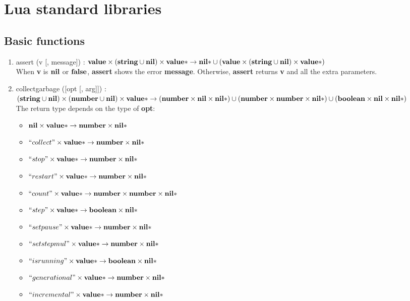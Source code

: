 
\section{Lua standard libraries}

\subsection{Basic functions}

\begin{enumerate}
\item assert (v [, message]) :
$\mathbf{value} \times
(\mathbf{string} \cup \mathbf{nil}) \times
\mathbf{value}{*} \rightarrow
\mathbf{nil}{*} \cup
(\mathbf{value} \times
(\mathbf{string} \cup \mathbf{nil}) \times
\mathbf{value}{*})$ 
\\
When \textbf{v} is $\mathbf{nil}$ or $\mathbf{false}$, \textbf{assert}
shows the error \textbf{message}.
Otherwise, \textbf{assert} returns \textbf{v} and all the extra
parameters.
\item collectgarbage ([opt [, arg]]) :
$(\mathbf{string} \cup \mathbf{nil}) \times
(\mathbf{number} \cup \mathbf{nil}) \times
\mathbf{value}{*} \rightarrow
(\mathbf{number} \times \mathbf{nil} \times \mathbf{nil}{*}) \cup
(\mathbf{number} \times \mathbf{number} \times \mathbf{nil}{*}) \cup
(\mathbf{boolean} \times \mathbf{nil} \times \mathbf{nil}{*})$
\\
The return type depends on the type of \textbf{opt}:
\begin{itemize}
\item $\mathbf{nil} \times \mathbf{value}{*} \rightarrow \mathbf{number} \times \mathbf{nil}{*}$
\item $``collect" \times \mathbf{value}{*} \rightarrow \mathbf{number} \times \mathbf{nil}{*}$
\item $``stop" \times \mathbf{value}{*} \rightarrow \mathbf{number} \times \mathbf{nil}{*}$
\item $``restart" \times \mathbf{value}{*} \rightarrow \mathbf{number} \times \mathbf{nil}{*}$
\item $``count" \times \mathbf{value}{*} \rightarrow \mathbf{number} \times \mathbf{number} \times \mathbf{nil}{*}$
\item $``step" \times \mathbf{value}{*} \rightarrow \mathbf{boolean} \times \mathbf{nil}{*}$
\item $``setpause" \times \mathbf{value}{*} \rightarrow \mathbf{number} \times \mathbf{nil}{*}$
\item $``setstepmul" \times \mathbf{value}{*} \rightarrow \mathbf{number} \times \mathbf{nil}{*}$
\item $``isrunning" \times \mathbf{value}{*} \rightarrow \mathbf{boolean} \times \mathbf{nil}{*}$
\item $``generational" \times \mathbf{value}{*} \rightarrow \mathbf{number} \times \mathbf{nil}{*}$
\item $``incremental" \times \mathbf{value}{*} \rightarrow \mathbf{number} \times \mathbf{nil}{*}$

\end{itemize}
\end{enumerate}
